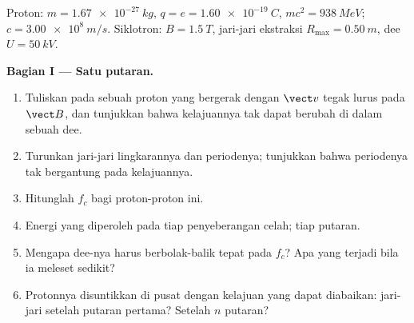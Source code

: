 \begin{problem}
\label{pb:b1:charged-particles:1}
Proton: $m = \qty{1.67e-27}{kg}$, $q = e = \qty{1.60e-19}{C}$, $mc^2 =
\qty{938}{MeV}$; $c = \qty{3.00e8}{m/s}$. Siklotron: $B = \qty{1.5}{T}$,
jari-jari ekstraksi $R_{\max} = \qty{0.50}{m}$,   dee
$U = \qty{50}{kV}$.

\medskip
\noindent\textbf{Bagian I --- Satu putaran.}
\begin{enumerate}
  \item Tuliskan  pada sebuah proton yang bergerak dengan $\vect v$
        tegak lurus pada $\vect B$, dan tunjukkan bahwa kelajuannya tak dapat
        berubah di dalam sebuah dee.
  \item Turunkan jari-jari lingkarannya dan periodenya; tunjukkan bahwa
        periodenya tak bergantung pada kelajuannya.
  \item Hitunglah  $f_c$ bagi proton-proton ini.
  \item Energi yang diperoleh pada tiap penyeberangan celah; tiap putaran.
  \item Mengapa  dee-nya harus berbolak-balik tepat pada $f_c$? Apa
        yang terjadi bila ia meleset sedikit?
  \item Protonnya disuntikkan di pusat dengan kelajuan yang dapat diabaikan:
        jari-jari setelah putaran pertama? Setelah $n$ putaran?
\end{enumerate}


\end{problem}
